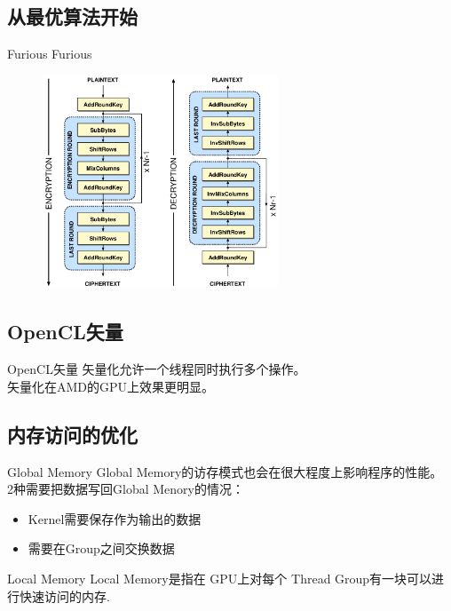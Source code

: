 \documentclass{beamer}
\begin{document}
\subsection{从最优算法开始}
\begin{frame}{Furious}
\huge Furious
\begin{figure}

\includegraphics[width=7cm]{rijndael.png}
\end{figure}
\end{frame}

\subsection{OpenCL矢量}

\begin{frame}{OpenCL矢量}
矢量化允许一个线程同时执行多个操作。\\
矢量化在AMD的GPU上效果更明显。

\end{frame}

\subsection{内存访问的优化}

\begin{frame}{Global Memory}
Global Memory的访存模式也会在很大程度上影响程序的性能。\\
2种需要把数据写回Global Menory的情况：
   \begin{itemize}
   \item Kernel需要保存作为输出的数据
   \item 需要在Group之间交换数据   
   \end{itemize}
\end{frame}

\begin{frame}{Local Memory}
  Local Memory是指在 GPU上对每个 Thread Group有一块可以进行快速访问的内存.
\end{frame}
\end{document}
